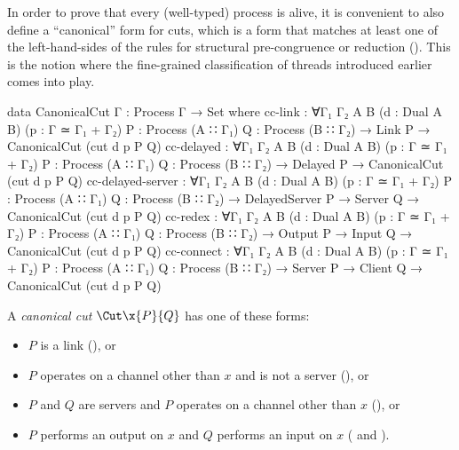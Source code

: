 In order to prove that every (well-typed) process is alive, it is convenient to
also define a ``canonical'' form for cuts, which is a form that matches at least
one of the left-hand-sides of the rules for structural pre-congruence or
reduction (). This is the notion where the fine-grained
classification of threads introduced earlier comes into play.

\begin{code}
data CanonicalCut {Γ} : Process Γ → Set where
  cc-link :
    ∀{Γ₁ Γ₂ A B} (d : Dual A B) (p : Γ ≃ Γ₁ + Γ₂)
    {P : Process (A ∷ Γ₁)} {Q : Process (B ∷ Γ₂)} →
    Link P → CanonicalCut (cut d p P Q)
  cc-delayed :
    ∀{Γ₁ Γ₂ A B} (d : Dual A B) (p : Γ ≃ Γ₁ + Γ₂)
    {P : Process (A ∷ Γ₁)} {Q : Process (B ∷ Γ₂)} →
    Delayed P → CanonicalCut (cut d p P Q)
  cc-delayed-server :
    ∀{Γ₁ Γ₂ A B} (d : Dual A B) (p : Γ ≃ Γ₁ + Γ₂)
    {P : Process (A ∷ Γ₁)} {Q : Process (B ∷ Γ₂)} →
    DelayedServer P → Server Q → CanonicalCut (cut d p P Q)
  cc-redex :
    ∀{Γ₁ Γ₂ A B} (d : Dual A B) (p : Γ ≃ Γ₁ + Γ₂)
    {P : Process (A ∷ Γ₁)} {Q : Process (B ∷ Γ₂)} →
    Output P → Input Q → CanonicalCut (cut d p P Q)
  cc-connect :
    ∀{Γ₁ Γ₂ A B} (d : Dual A B) (p : Γ ≃ Γ₁ + Γ₂)
    {P : Process (A ∷ Γ₁)} {Q : Process (B ∷ Γ₂)} →
    Server P → Client Q → CanonicalCut (cut d p P Q)
\end{code}

A \emph{canonical cut} $\Cut\x{P}{Q}$ has one of these forms:
\begin{itemize}
\item $P$ is a link (), or
\item $P$ operates on a channel other than $x$ and is not a server
(), or
\item $P$ and $Q$ are servers and $P$ operates on a channel other than $x$
(), or
\item $P$ performs an output on $x$ and $Q$ performs an input on $x$
( and ).
\end{itemize}

